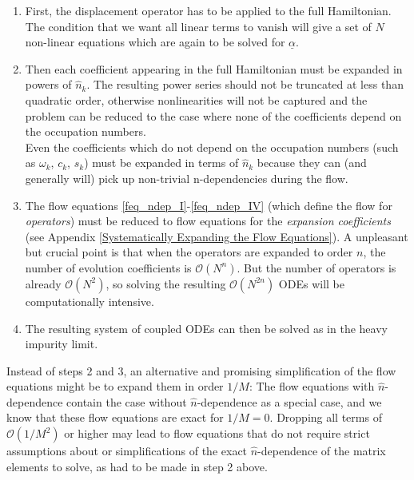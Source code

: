 \begin{enumerate}
\item First, the displacement operator has to be applied to the full Hamiltonian. The condition that we want all linear terms to vanish will give a set of $N$ non-linear equations which are again to be solved for $\underline\alpha$. 
\item Then each coefficient appearing in the full Hamiltonian must be expanded in powers of $\hat n_k$. The resulting power series should not be truncated at less than quadratic order, otherwise nonlinearities will not be captured and the problem can be reduced to the case where none of the coefficients depend on the occupation numbers. \\ Even the coefficients which do not depend on the occupation numbers (such as $\omega_k$, $c_k$, $s_k$) must be expanded in terms of $\hat n_k$ because they can (and generally will) pick up non-trivial n-dependencies during the flow.
\item The flow equations \ref{feq_ndep_I}-\ref{feq_ndep_IV} (which define the flow for \emph{operators}) must be reduced to flow equations for the \emph{expansion coefficients} (see Appendix \ref{Systematically Expanding the Flow Equations}). A unpleasant but crucial point is that when the operators are expanded to order $n$, the number of evolution coefficients is $\mathcal O(N^n)$. But the number of operators is already $\mathcal O(N^2)$, so solving the resulting $\mathcal O(N^{2n})$ ODEs will be computationally intensive.
\item The resulting system of coupled ODEs can then be solved as in the heavy impurity limit.
\end{enumerate}
Instead of steps 2 and 3, an alternative and promising simplification of the flow equations might be to expand them in order $1/M$: The flow equations with $\hat n$-dependence contain the case without $\hat n$-dependence as a special case, and we know that these flow equations are exact for $1/M=0$. Dropping all terms of $\mathcal O(1/M^2)$ or higher may lead to flow equations that do not require strict assumptions about or simplifications of the exact $\hat n$-dependence of the matrix elements to solve, as had to be made in step 2 above.





























































